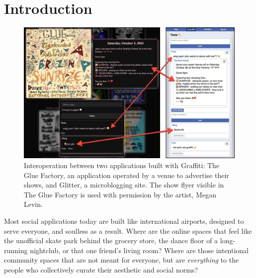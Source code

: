 \section{Introduction}

\begin{figure}[h]
    \centering
    \includegraphics[width=\textwidth]{figures/gloof-and-glitter.jpg}
    \caption{
    Interoperation between two applications built with Graffiti:
    The Glue Factory, an application operated by a venue to advertise their shows,
    and Glitter, a microblogging site.
    The show flyer visible in The Glue Factory is used with permission by the artist, Megan Levin.
    }
    \label{case-studies:fig:gloof-and-glitter}
\end{figure}

Most social applications today are built like international airports,
designed to serve everyone, and soulless as a result.
Where are the online spaces that feel like
the unofficial skate park behind the grocery store,
the dance floor of a long-running nightclub,
or that one friend's living room?
Where are those intentional community spaces that
are not meant for everyone,
but are \emph{everything} to the people
who collectively curate their aesthetic and social norms?

